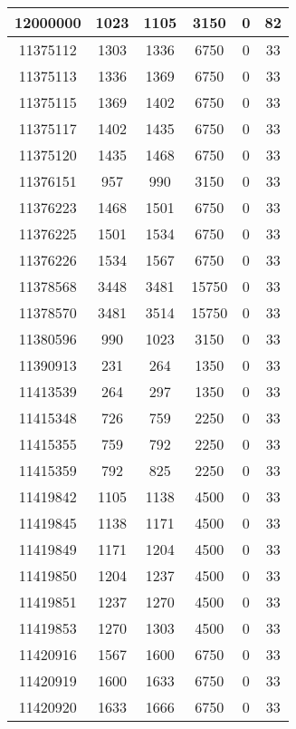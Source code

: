 \begin{appendices}
\begin{center}
\begin{longtable}{|c|c|c|c|c|c|}
12000000 & 1023  & 1105  & 3150  & 0     & 82  \\ \hline
11375112 & 1303  & 1336  & 6750  & 0     & 33  \\ \hline
11375113 & 1336  & 1369  & 6750  & 0     & 33  \\ \hline
11375115 & 1369  & 1402  & 6750  & 0     & 33  \\ \hline
11375117 & 1402  & 1435  & 6750  & 0     & 33  \\ \hline
11375120 & 1435  & 1468  & 6750  & 0     & 33  \\ \hline
11376151 & 957   & 990   & 3150  & 0     & 33  \\ \hline
11376223 & 1468  & 1501  & 6750  & 0     & 33  \\ \hline
11376225 & 1501  & 1534  & 6750  & 0     & 33  \\ \hline
11376226 & 1534  & 1567  & 6750  & 0     & 33  \\ \hline
11378568 & 3448  & 3481  & 15750 & 0     & 33  \\ \hline
11378570 & 3481  & 3514  & 15750 & 0     & 33  \\ \hline
11380596 & 990   & 1023  & 3150  & 0     & 33  \\ \hline
11390913 & 231   & 264   & 1350  & 0     & 33  \\ \hline
11413539 & 264   & 297   & 1350  & 0     & 33  \\ \hline
11415348 & 726   & 759   & 2250  & 0     & 33  \\ \hline
11415355 & 759   & 792   & 2250  & 0     & 33  \\ \hline
11415359 & 792   & 825   & 2250  & 0     & 33  \\ \hline
11419842 & 1105  & 1138  & 4500  & 0     & 33  \\ \hline
11419845 & 1138  & 1171  & 4500  & 0     & 33  \\ \hline
11419849 & 1171  & 1204  & 4500  & 0     & 33  \\ \hline
11419850 & 1204  & 1237  & 4500  & 0     & 33  \\ \hline
11419851 & 1237  & 1270  & 4500  & 0     & 33  \\ \hline
11419853 & 1270  & 1303  & 4500  & 0     & 33  \\ \hline
11420916 & 1567  & 1600  & 6750  & 0     & 33  \\ \hline
11420919 & 1600  & 1633  & 6750  & 0     & 33  \\ \hline
11420920 & 1633  & 1666  & 6750  & 0     & 33  \\ \hline

\end{longtable}
\end{center}
\end{appendices}
